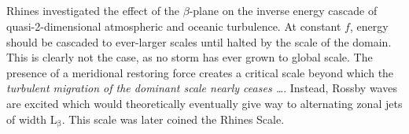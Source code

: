 \subsection{\cite{Rhines2006}}\label{sec:hist_rhines}
Rhines investigated the effect of the $\beta$-plane on the inverse energy cascade of quasi-2-dimensional atmospheric and oceanic turbulence. At constant $f$, energy should be cascaded to ever-larger scales until halted by the scale of the domain. This is clearly not the case, as no storm has ever grown to global scale. The presence of a meridional restoring force creates a critical scale beyond which the \textit{turbulent migration of the dominant scale nearly ceases \ldots}. Instead, Rossby waves are excited which would theoretically eventually give way to alternating zonal jets of width $\mathrm{L_{\beta}}$. This scale was later coined the Rhines Scale.


